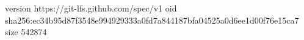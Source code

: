 version https://git-lfs.github.com/spec/v1
oid sha256:ec34b95d87f3548e994929333a0fd7a844187bfa04525a0d6ee1d00f76e15ca7
size 542874
